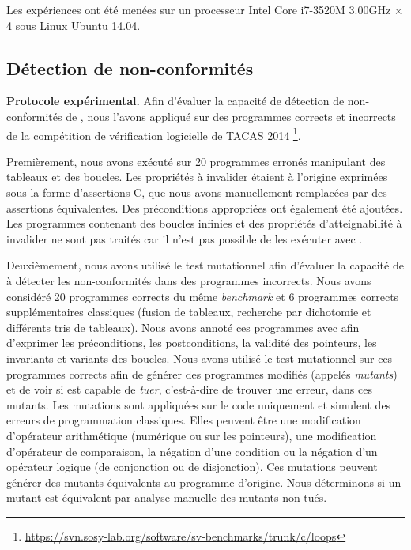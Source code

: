 Les expériences ont été menées sur un processeur Intel Core i7-3520M 3.00GHz
$\times$ 4 sous Linux Ubuntu 14.04.


\subsection{Détection de non-conformités}


\textbf{Protocole expérimental.}
Afin d'évaluer la capacité de détection de non-conformités de \NCD, nous
l'avons appliqué sur des programmes corrects et incorrects de la compétition
de vérification logicielle de TACAS 2014 \footnote{
  \url{https://svn.sosy-lab.org/software/sv-benchmarks/trunk/c/loops}
}.

Premièrement, nous avons exécuté \stady sur 20 programmes erronés manipulant des
tableaux et des boucles.
Les propriétés à invalider étaient à l'origine exprimées sous la forme
d'assertions C, que nous avons manuellement remplacées par des assertions \eacsl
équivalentes.
Des préconditions \eacsl appropriées ont également été ajoutées.
Les programmes contenant des boucles infinies et des propriétés d'atteignabilité
à invalider ne sont pas traités car il n'est pas possible de les exécuter avec
\pathcrawler.

Deuxièmement, nous avons utilisé le test mutationnel afin d'évaluer la capacité
de \stady à détecter les non-conformités dans des programmes incorrects.
Nous avons considéré 20 programmes corrects du même {\em benchmark} et 6
programmes corrects supplémentaires classiques (fusion de tableaux, recherche
par dichotomie et différents tris de tableaux).
Nous avons annoté ces programmes avec \eacsl afin d'exprimer les préconditions,
les postconditions, la validité des pointeurs, les invariants et variants des
boucles.
Nous avons utilisé le test mutationnel sur ces programmes corrects afin de
générer des programmes modifiés (appelés {\em mutants}) et de voir si \stady
est capable de {\em tuer}, c'est-à-dire de trouver une erreur, dans ces mutants.
Les mutations sont appliquées sur le code uniquement et simulent des erreurs de
programmation classiques.
Elles peuvent être une modification d'opérateur arithmétique (numérique ou sur
les pointeurs), une modification d'opérateur de comparaison, la négation d'une
condition ou la négation d'un opérateur logique (de conjonction ou de
disjonction).
Ces mutations peuvent générer des mutants équivalents au programme d'origine.
Nous déterminons si un mutant est équivalent par analyse manuelle des mutants
non tués.

